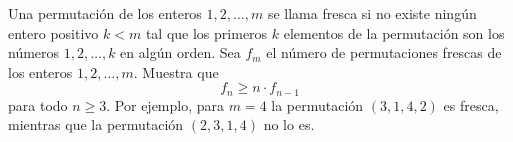 Una permutación de los enteros $1, 2, \dots , m$ se llama fresca si no existe ningún entero
positivo $k \lt m$ tal que los primeros $k$ elementos de la permutación son los números $1, 2, \dots , k$ en
algún orden. Sea $f_m$ el número de permutaciones frescas de los enteros $1, 2, \dots , m.$
Muestra que \[f_n \ge n \cdot f_{n-1}\] para todo $n \ge 3$.
Por ejemplo, para $m = 4$ la permutación $(3, 1, 4, 2)$ es fresca, mientras que la permutación $(2, 3, 1, 4)$
no lo es.